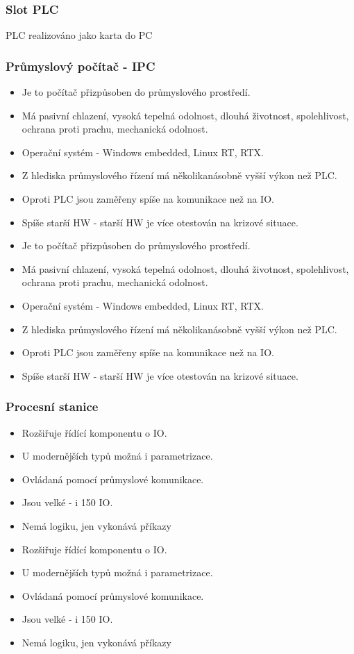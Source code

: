 \subsubsection*{Slot PLC}
PLC realizováno jako karta do PC

\subsubsection*{Průmyslový počítač - IPC}
\begin{itemize}
  \item Je to počítač přizpůsoben do průmyslového prostředí.
  \item Má pasivní chlazení, vysoká tepelná odolnost, dlouhá životnost, spolehlivost, ochrana proti prachu, mechanická odolnost.
  \item Operační systém - Windows embedded, Linux RT, RTX.
  \item Z hlediska průmyslového řízení má několikanásobně vyšší výkon než PLC.
  \item Oproti PLC jsou zaměřeny spíše na komunikace než na IO.
  \item Spíše starší HW - starší HW je více otestován na krizové situace.
    \item Je to počítač přizpůsoben do průmyslového prostředí.
    \item Má pasivní chlazení, vysoká tepelná odolnost, dlouhá životnost, spolehlivost, ochrana proti prachu, mechanická odolnost.
    \item Operační systém - Windows embedded, Linux RT, RTX.
    \item Z hlediska průmyslového řízení má několikanásobně vyšší výkon než PLC.
    \item Oproti PLC jsou zaměřeny spíše na komunikace než na IO.
    \item Spíše starší HW - starší HW je více otestován na krizové situace.
\end{itemize}

\subsubsection*{Procesní stanice}
\begin{itemize}
  \item Rozšiřuje řídící komponentu o IO.
  \item U modernějších typů možná i parametrizace.
  \item Ovládaná pomocí průmyslové komunikace.
  \item Jsou velké - i 150 IO.
  \item Nemá logiku, jen vykonává příkazy
    \item Rozšiřuje řídící komponentu o IO.
    \item U modernějších typů možná i parametrizace.
    \item Ovládaná pomocí průmyslové komunikace.
    \item Jsou velké - i 150 IO.
    \item Nemá logiku, jen vykonává příkazy
\end{itemize}

